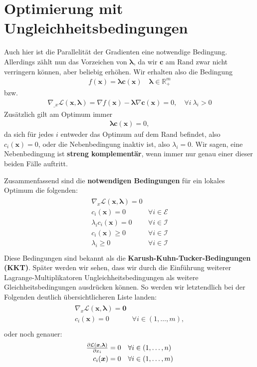 \documentclass{report}
\newcommand{\tbf}{\textbf}
\newcommand{\pd}[2]{\frac{\partial #1}{\partial #2}}
\newcommand*{\newpar}{\par\vspace{\baselineskip}\noindent}
\begin{document}
\section{Optimierung mit Ungleichheitsbedingungen}
Auch hier ist die Parallelität der Gradienten eine notwendige Bedingung. Allerdings zählt nun das Vorzeichen von $\bm{\lambda}$, da wir $\bm{c}$ am Rand zwar nicht verringern können, aber beliebig erhöhen. Wir erhalten also die Bedingung
\begin{align*}
 f(\bm{x})  = \bm{\lambda c}(\bm{x}) \quad \bm{\lambda} \in \mathbb{R}_+^m
\end{align*}
bzw.
\begin{align*}
 \nabla_{\bm_x} \mathcal{L}(\bm{x}, \bm{\lambda}) = \nabla f(\bm{x}) - \bm{\lambda} \nabla \bm{c}(\bm{x}) = 0, \quad \forall i\ \lambda_i > 0
\end{align*}
Zusätzlich gilt am Optimum immer
\begin{align*}
 \bm{\lambda c}(\bm{x}) = 0,
\end{align*}
da sich für jedes $i$ entweder das Optimum auf dem Rand befindet, also $c_i(\bm{x}) = 0$, oder die Nebenbedingung inaktiv ist, also $\lambda_i = 0$. Wir sagen, eine Nebenbedingung ist \tbf{streng komplementär}, wenn immer nur genau einer dieser beiden Fälle auftritt.
\newpar
Zusammenfassend sind die \tbf{notwendigen Bedingungen} für ein lokales Optimum die folgenden:
\begin{align*}
\begin{array}{rl}
 \nabla_x \mathcal{L}(\bm{x}, \bm{\lambda}) = 0 \\
 c_i(\bm{x}) = 0 &\forall i \in \mathcal{E}\\
 \lambda_i c_i(\bm{x}) = 0 &\forall i \in \mathcal{I}\\
 c_i(\bm{x}) \geq 0 &\forall i \in \mathcal{I}\\
 \lambda_i \geq 0 &\forall i \in \mathcal{I}\\
\end{array}
\end{align*}
Diese Bedingungen sind bekannt als die \tbf{Karush-Kuhn-Tucker-Bedingungen (KKT)}. Später werden wir sehen, dass wir durch die Einführung weiterer Lagrange-Multiplikatoren Ungleichheitsbedingungen als weitere Gleichheitsbedingungen ausdrücken können. So werden wir letztendlich bei der Folgenden deutlich übersichtlicheren Liste landen:
\begin{align*}
\begin{array}{rl}
 \nabla_x {\mathcal{L}(\bm{x}, \bm{\lambda})} = \bm{0}\\
 c_i(\bm{x}) = 0 &\forall i \in (1,\hdots,m),\\
\end{array}
\end{align*}
oder noch genauer:
\begin{align*}
\begin{array}{rl}
 \pd{\mathcal{L}(\bm{x}, \bm{\lambda})}{x_i} = 0 &\forall i \in (1,\hdots,n)\vspace{1mm}\\
 c_i(\bm{x}) = 0 &\forall i \in (1,\hdots,m)\\
\end{array}
\end{align*}
%
\end{document}
